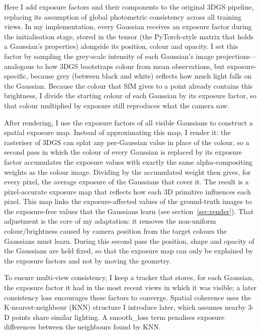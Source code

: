 \documentclass[11pt,a4paper]{article}
\begin{document}
Here I add exposure factors and their components to the original 3DGS pipeline, replacing its assumption of global photometric consistency across all training views. In my implementation, every Gaussian receives an exposure factor during the initialisation stage, stored in the tensor (the PyTorch-style matrix that holds a Gaussian's properties) alongside its position, colour and opacity. I set this factor by sampling the grey-scale intensity of each Gaussian's image projections---analogous to how 3DGS bootstraps colour from mean observations, but exposure-specific, because grey (between black and white) reflects how much light falls on the Gaussian. Because the colour that SfM gives to a point already contains this brightness, I divide the starting colour of each Gaussian by its exposure factor, so that colour multiplied by exposure still reproduces what the camera saw.

After rendering, I use the exposure factors of all visible Gaussians to construct a spatial exposure map. Instead of approximating this map, I render it: the rasteriser of 3DGS can splat any per-Gaussian value in place of the colour, so a second pass in which the colour of every Gaussian is replaced by its exposure factor accumulates the exposure values with exactly the same alpha-compositing weights as the colour image. Dividing by the accumulated weight then gives, for every pixel, the average exposure of the Gaussians that cover it. The result is a pixel-accurate exposure map that reflects how each 3D primitive influences each pixel. This map links the exposure-affected values of the ground-truth images to the exposure-free values that the Gaussians learn (see section~\ref{sec:render}). That adjustment is the core of my adaptation: it removes the non-uniform colour/brightness caused by camera position from the target colours the Gaussians must learn. During this second pass the position, shape and opacity of the Gaussians are held fixed, so that the exposure map can only be explained by the exposure factors and not by moving the geometry.

To ensure multi-view consistency, I keep a tracker that stores, for each Gaussian, the exposure factor it had in the most recent views in which it was visible; a later consistency loss encourages these factors to converge. Spatial coherence uses the K-nearest-neighbour (KNN) structure \cite{ref29} I introduce later, which assumes nearby 3-D points share similar lighting. A smooth\_loss term penalises exposure differences between the neighbours found by KNN.
\end{document}

